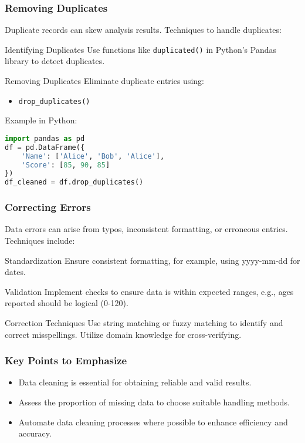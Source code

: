 \documentclass[aspectratio=169]{beamer}
\begin{document}
\begin{frame}
    \frametitle{Removing Duplicates}
    Duplicate records can skew analysis results. Techniques to handle duplicates:
    
    \begin{block}{Identifying Duplicates}
        Use functions like \texttt{duplicated()} in Python’s Pandas library to detect duplicates.
    \end{block}
    
    \begin{block}{Removing Duplicates}
        Eliminate duplicate entries using:
        \begin{itemize}
            \item \texttt{drop\_duplicates()} 
        \end{itemize}
        Example in Python:
        \begin{lstlisting}[language=Python]
import pandas as pd
df = pd.DataFrame({
    'Name': ['Alice', 'Bob', 'Alice'],
    'Score': [85, 90, 85]
})
df_cleaned = df.drop_duplicates()
        \end{lstlisting}
    \end{block}
\end{frame}

\begin{frame}
    \frametitle{Correcting Errors}
    Data errors can arise from typos, inconsistent formatting, or erroneous entries. Techniques include:
    
    \begin{block}{Standardization}
        Ensure consistent formatting, for example, using yyyy-mm-dd for dates.
    \end{block}
    
    \begin{block}{Validation}
        Implement checks to ensure data is within expected ranges, e.g., ages reported should be logical (0-120).
    \end{block}
    
    \begin{block}{Correction Techniques}
        Use string matching or fuzzy matching to identify and correct misspellings. Utilize domain knowledge for cross-verifying.
    \end{block}
\end{frame}

\begin{frame}
    \frametitle{Key Points to Emphasize}
    \begin{itemize}
        \item Data cleaning is essential for obtaining reliable and valid results.
        \item Assess the proportion of missing data to choose suitable handling methods.
        \item Automate data cleaning processes where possible to enhance efficiency and accuracy.
    \end{itemize}
\end{frame}
\end{document}
